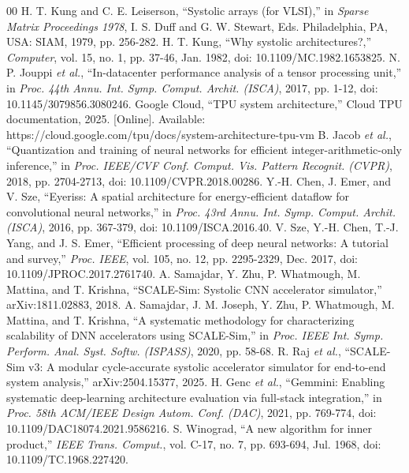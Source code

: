 \documentclass[conference]{IEEEtran}
\begin{document}
\begin{thebibliography}{00}
 H. T. Kung and C. E. Leiserson, ``Systolic arrays (for VLSI),'' in \emph{Sparse Matrix Proceedings 1978}, I. S. Duff and G. W. Stewart, Eds. Philadelphia, PA, USA: SIAM, 1979, pp. 256-282.
 H. T. Kung, ``Why systolic architectures?,'' \emph{Computer}, vol. 15, no. 1, pp. 37-46, Jan. 1982, doi: 10.1109/MC.1982.1653825.
 N. P. Jouppi \emph{et al.}, ``In-datacenter performance analysis of a tensor processing unit,'' in \emph{Proc. 44th Annu. Int. Symp. Comput. Archit. (ISCA)}, 2017, pp. 1-12, doi: 10.1145/3079856.3080246.
 Google Cloud, ``TPU system architecture,'' Cloud TPU documentation, 2025. [Online]. Available: https://cloud.google.com/tpu/docs/system-architecture-tpu-vm
 B. Jacob \emph{et al.}, ``Quantization and training of neural networks for efficient integer-arithmetic-only inference,'' in \emph{Proc. IEEE/CVF Conf. Comput. Vis. Pattern Recognit. (CVPR)}, 2018, pp. 2704-2713, doi: 10.1109/CVPR.2018.00286.
 Y.-H. Chen, J. Emer, and V. Sze, ``Eyeriss: A spatial architecture for energy-efficient dataflow for convolutional neural networks,'' in \emph{Proc. 43rd Annu. Int. Symp. Comput. Archit. (ISCA)}, 2016, pp. 367-379, doi: 10.1109/ISCA.2016.40.
 V. Sze, Y.-H. Chen, T.-J. Yang, and J. S. Emer, ``Efficient processing of deep neural networks: A tutorial and survey,'' \emph{Proc. IEEE}, vol. 105, no. 12, pp. 2295-2329, Dec. 2017, doi: 10.1109/JPROC.2017.2761740.
 A. Samajdar, Y. Zhu, P. Whatmough, M. Mattina, and T. Krishna, ``SCALE-Sim: Systolic CNN accelerator simulator,'' arXiv:1811.02883, 2018.
 A. Samajdar, J. M. Joseph, Y. Zhu, P. Whatmough, M. Mattina, and T. Krishna, ``A systematic methodology for characterizing scalability of DNN accelerators using SCALE-Sim,'' in \emph{Proc. IEEE Int. Symp. Perform. Anal. Syst. Softw. (ISPASS)}, 2020, pp. 58-68.
 R. Raj \emph{et al.}, ``SCALE-Sim v3: A modular cycle-accurate systolic accelerator simulator for end-to-end system analysis,'' arXiv:2504.15377, 2025.
 H. Genc \emph{et al.}, ``Gemmini: Enabling systematic deep-learning architecture evaluation via full-stack integration,'' in \emph{Proc. 58th ACM/IEEE Design Autom. Conf. (DAC)}, 2021, pp. 769-774, doi: 10.1109/DAC18074.2021.9586216.
 S. Winograd, ``A new algorithm for inner product,'' \emph{IEEE Trans. Comput.}, vol. C-17, no. 7, pp. 693-694, Jul. 1968, doi: 10.1109/TC.1968.227420.

\end{thebibliography}
\end{document}
